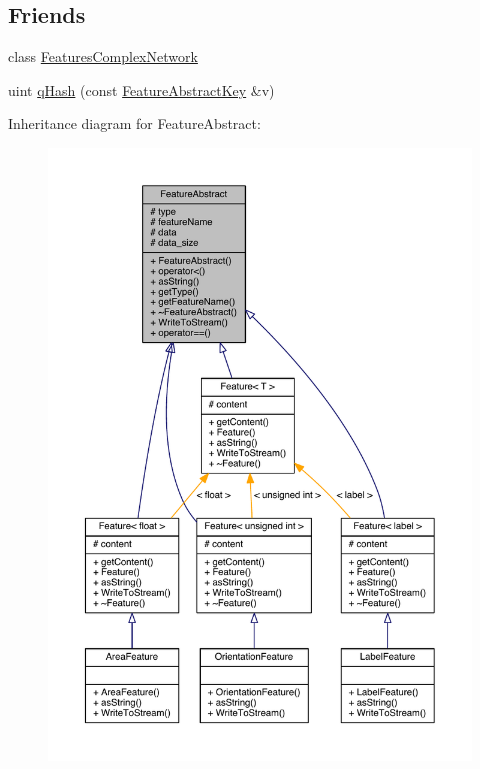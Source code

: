 \subsection*{Friends}
\begin{DoxyCompactItemize}
\item 
class \hyperlink{class_feature_abstract_ac83197c9714439d51f43440c042625e7}{Features\+Complex\+Network}
\item 
uint \hyperlink{class_feature_abstract_aca59f644613693185e40001464f20995}{q\+Hash} (const \hyperlink{class_feature_abstract_key}{Feature\+Abstract\+Key} \&v)
\end{DoxyCompactItemize}


Inheritance diagram for Feature\+Abstract\+:\nopagebreak
\begin{figure}[H]
\begin{center}
\leavevmode
\includegraphics[width=350pt]{class_feature_abstract__inherit__graph}
\end{center}
\end{figure}


